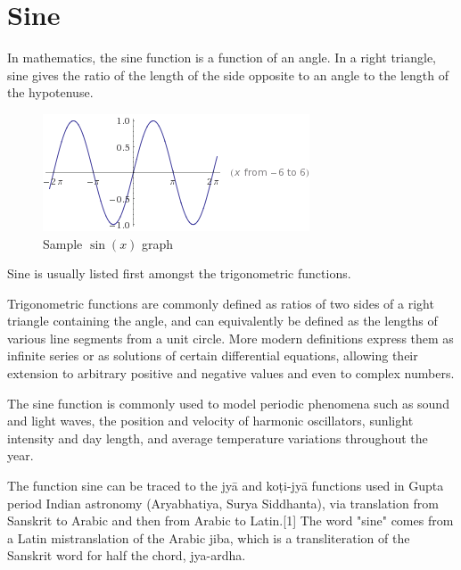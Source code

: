 \section{Sine}

In mathematics, the sine function is a function of an angle. In a right triangle, 
sine gives the ratio of the length of the side opposite to an angle to the length 
of the hypotenuse.

\begin{figure}[h]
    \includegraphics{sin(x).png}
    \caption{Sample $\sin(x)$ graph}
\end{figure}

Sine is usually listed first amongst the trigonometric functions.

Trigonometric functions are commonly defined as ratios of two sides of a right 
triangle containing the angle, and can equivalently be defined as the lengths of 
various line segments from a unit circle. More modern definitions express them as 
infinite series or as solutions of certain differential equations, allowing their 
extension to arbitrary positive and negative values and even to complex numbers.

The sine function is commonly used to model periodic phenomena such as sound and 
light waves, the position and velocity of harmonic oscillators, sunlight intensity
and day length, and average temperature variations throughout the year.

The function sine can be traced to the jyā and koṭi-jyā functions used in Gupta 
period Indian astronomy (Aryabhatiya, Surya Siddhanta), via translation from Sanskrit 
to Arabic and then from Arabic to Latin.[1] The word "sine" comes from a Latin 
mistranslation of the Arabic jiba, which is a transliteration of the Sanskrit 
word for half the chord, jya-ardha.